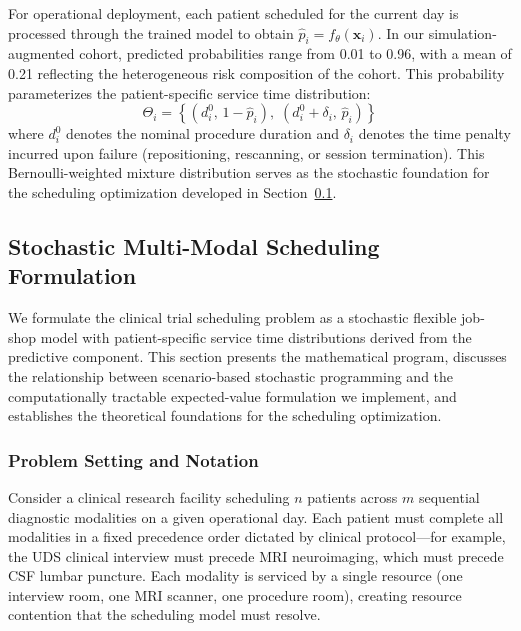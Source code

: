 \documentclass[11pt,a4paper]{article}
\begin{document}
For operational deployment, each patient scheduled for the current day is processed through the trained model to obtain $\hat{p}_i = f_\theta(\mathbf{x}_i)$. In our simulation-augmented cohort, predicted probabilities range from 0.01 to 0.96, with a mean of 0.21 reflecting the heterogeneous risk composition of the cohort. This probability parameterizes the patient-specific service time distribution:
\begin{equation}
\Theta_i = \left\{ \left(d_i^0,\, 1 - \hat{p}_i\right),\; \left(d_i^0 + \delta_i,\, \hat{p}_i\right) \right\}
\label{eq:bernoulli_params}
\end{equation}
where $d_i^0$ denotes the nominal procedure duration and $\delta_i$ denotes the time penalty incurred upon failure (repositioning, rescanning, or session termination). This Bernoulli-weighted mixture distribution serves as the stochastic foundation for the scheduling optimization developed in Section~\ref{sec:scheduling_formulation}.



\subsection{Stochastic Multi-Modal Scheduling Formulation}
\label{sec:scheduling_formulation}

We formulate the clinical trial scheduling problem as a stochastic flexible job-shop model with patient-specific service time distributions derived from the predictive component. This section presents the mathematical program, discusses the relationship between scenario-based stochastic programming and the computationally tractable expected-value formulation we implement, and establishes the theoretical foundations for the scheduling optimization.

\subsubsection{Problem Setting and Notation}

Consider a clinical research facility scheduling $n$ patients across $m$ sequential diagnostic modalities on a given operational day. Each patient must complete all modalities in a fixed precedence order dictated by clinical protocol---for example, the UDS clinical interview must precede MRI neuroimaging, which must precede CSF lumbar puncture. Each modality is serviced by a single resource (one interview room, one MRI scanner, one procedure room), creating resource contention that the scheduling model must resolve.
\end{document}
